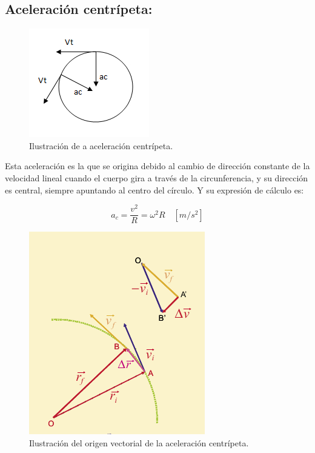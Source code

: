 \documentclass[a5paper,pagesize,10pt,bibtotoc,pointlessnumbers,
normalheadings,DIV=9,fleqn,x11names,table,twoside=false]{scrbook}
\begin{document}
\subsection{Aceleración centrípeta:}

\begin{figure}[ht]
 \centering
 \includegraphics[scale=0.6]{images/aceleracion-centripeta.jpg}
 \caption{Ilustración de a aceleración centrípeta.}\label{ac}
\end{figure}

Esta aceleración es la que se origina debido al cambio de dirección constante de la velocidad lineal cuando el cuerpo gira a 
través de la circunferencia, y su dirección es central, siempre apuntando al centro del círculo. Y su expresión de cálculo es:

\begin{equation}
a_c = \frac{v^2}{R} =  \omega^2 R\quad [m/s^2]
\end{equation}

\begin{figure}[ht]
 \centering
 \includegraphics[scale=0.6]{images/acentripeta.png}
 \caption{Ilustración del origen vectorial de la aceleración centrípeta.}\label{ac}
\end{figure} 
\end{document}
